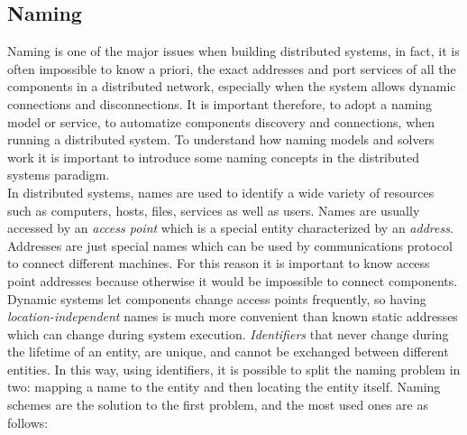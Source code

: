 \subsection{Naming}
Naming is one of the major issues when building distributed systems, in fact, it is often impossible to know a priori, the exact addresses and port services of all the components in a distributed network, especially when the system allows dynamic connections and disconnections. It is important therefore, to adopt a naming model or service, to automatize components discovery and connections, when running a distributed system. To understand how naming models and solvers work it is important to introduce some naming concepts in the distributed systems paradigm.\\
In distributed systems, names are used to identify a wide variety of resources such as computers, hosts, files, services as well as users. Names are usually accessed by an \textit{access point} which is a special entity characterized by an \textit{address}. Addresses are just special names which can be used by communications protocol to connect different machines. For this reason it is important to know access point addresses because otherwise it would be impossible to connect components. Dynamic systems let components change access points frequently, so having \textit{location-independent} names is much more convenient than known static addresses which can change during system execution. \textit{Identifiers} that never change during the lifetime of an entity, are unique, and cannot be exchanged between different entities. In this way, using identifiers, it is possible to split the naming problem in two: mapping a name to the entity and then locating the entity itself.
Naming schemes are the solution to the first problem, and the most used ones are as follows:
